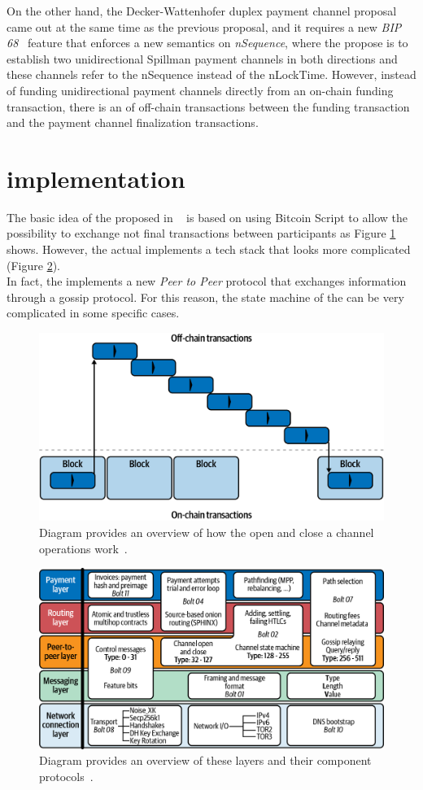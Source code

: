 On the other hand, the Decker-Wattenhofer duplex payment channel proposal came out at the same time as the previous proposal, and
it requires a new \emph{BIP 68}~\cite{bip68} feature that enforces a new semantics on \emph{nSequence}, where the propose is to
establish two unidirectional Spillman payment channels in both
directions and these channels refer to the nSequence instead of the nLockTime.
However, instead of funding unidirectional payment channels directly from an on-chain funding transaction, there is 
an  of off-chain transactions between the funding transaction and the payment channel finalization transactions.

\section{{\LN} implementation}

The basic idea of the {\LN} proposed in ~\cite{lightning-network-paper} is based on using Bitcoin Script
to allow the possibility to exchange not final transactions between participants as Figure \ref{fig:ln-onchain} shows.
However, the actual {\LN} implements a tech stack that looks more complicated (Figure \ref{fig:lightning-stack}).\\
In fact, the {\LN} implements a new \emph{Peer to Peer} protocol that exchanges information through
a gossip protocol. For this reason, the state machine of the {\LN}
can be very complicated in some specific cases.

\begin{figure}[h]
  \begin{center}
  \includegraphics[width=0.6\columnwidth]{imgs/mtln_0702.png}
  \end{center}
    \caption{Diagram provides an overview of how the open and close a channel operations work~\cite{lnbook}.}
  \label{fig:ln-onchain}
\end{figure}


\begin{figure}[h]
  \begin{center}
  \includegraphics[width=0.6\columnwidth]{imgs/mtln_0601.png}
  \end{center}
    \caption{Diagram provides an overview of these layers and their component protocols~\cite{lnbook}.}
  \label{fig:lightning-stack}
\end{figure}

